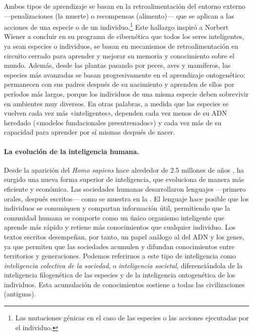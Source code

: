 \documentclass[../../book-main_es.tex]{subfiles}
\begin{document}
Ambos tipos de aprendizaje se basan en la retroalimentación del entorno
externo ---penalizaciones (la muerte) o recompensas (alimento)--- que se aplican a las
acciones de una especie o de un individuo.\footnote{Las mutaciones génicas en
el caso de las especies o las acciones ejecutadas por el individuo.} Este hallazgo
inspiró a Norbert Wiener a concluir en su programa de cibernética
\cite{Wiener-Cybernetics-1948} que todos los seres inteligentes, ya sean especies o
individuos, se basan en mecanismos de retroalimentación en circuito cerrado para
aprender y mejorar su memoria y conocimiento sobre el mundo. Además,
desde las plantas pasando por peces, aves y mamíferos, las especies más
avanzadas se basan progresivamente en el aprendizaje ontogenético: permanecen con
sus padres después de su nacimiento y aprenden de ellos por períodos más largos,
porque los individuos de una misma especie deben sobrevivir en ambientes
muy diversos. En otras palabras, a medida que las especies se vuelven cada vez 
más «inteligentes», dependen cada vez menos de su ADN heredado («modelos fundacionales 
preentrenados») y cada vez más de su capacidad para aprender por sí mismas 
después de nacer.

\paragraph{La evolución de la inteligencia humana.}
Desde la aparición del \textit{Homo sapiens} hace alrededor de 2.5
millones de años \cite{Harari-2015}, ha surgido una nueva forma superior de inteligencia, 
que evoluciona de manera más eficiente y económica.
Las sociedades humanas desarrollaron lenguajes ---primero orales, después escritos---
como se muestra en la . El lenguaje hace posible que los
individuos se comuniquen y compartan información útil, permitiendo que la
comunidad humana se comporte como un único organismo inteligente que aprende
más rápido y retiene más conocimientos que cualquier individuo. Los textos escritos
desempeñan, por tanto, un papel análogo al del ADN y los genes, ya que permiten que 
las sociedades acumulen y difundan conocimientos entre territorios y generaciones. 
Podemos referirnos a este tipo de inteligencia como \textit{inteligencia colectiva de la sociedad},
o \textit{inteligencia societal}, diferenciándola de la inteligencia filogenética de las especies y de la inteligencia
ontogenética de los individuos. Esta acumulación de conocimientos sostiene a todas las civilizaciones (antiguas).
\end{document}
